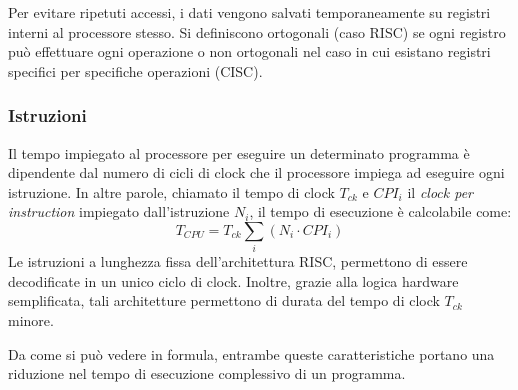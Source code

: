 \documentclass[../ace.tex]{subfiles}
\begin{document}
Per evitare ripetuti accessi, i dati vengono salvati temporaneamente su registri interni al processore stesso. Si definiscono ortogonali (caso RISC) se ogni registro può effettuare ogni operazione o non ortogonali nel caso in cui esistano registri specifici per specifiche operazioni (CISC).

\subsubsection{Istruzioni}
Il tempo impiegato al processore per eseguire un determinato programma è dipendente dal numero di cicli di clock che il processore impiega ad eseguire ogni istruzione. In altre parole, chiamato il tempo di clock $T_\mathit{ck}$ e $\mathit{CPI}_i$ il \textit{clock per instruction} impiegato dall'istruzione $N_i$, il tempo di esecuzione è calcolabile come:
\[
    T_{\mathit{CPU}} = T_{\mathit{ck}}\sum_i (N_i \cdot \mathit{CPI}_i)
\]
Le istruzioni a lunghezza fissa dell'architettura RISC, permettono di essere decodificate in un unico ciclo di clock.
Inoltre, grazie alla logica hardware semplificata, tali architetture permettono di durata del tempo di clock $T_\mathit{ck}$ minore.

Da come si può vedere in formula, entrambe queste caratteristiche portano una riduzione nel tempo di esecuzione complessivo di un programma.
\end{document}
